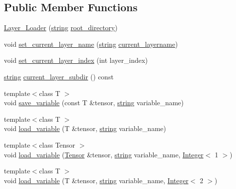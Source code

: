 \subsection*{Public Member Functions}
\begin{DoxyCompactItemize}
\item 
\hyperlink{structbc_1_1nn_1_1Layer__Loader_a6c0c0841d1783a7086914db80c806abd}{Layer\+\_\+\+Loader} (\hyperlink{structbc_1_1string}{string} \hyperlink{structbc_1_1nn_1_1Layer__Loader_a8447f957112de14989e567aab56d847b}{root\+\_\+directory})
\item 
void \hyperlink{structbc_1_1nn_1_1Layer__Loader_af679b0095e96922dfbb9dea7e4e1dcfb}{set\+\_\+current\+\_\+layer\+\_\+name} (\hyperlink{structbc_1_1string}{string} \hyperlink{structbc_1_1nn_1_1Layer__Loader_a51ea68daf7551573c3bd85d805c25da6}{current\+\_\+layername})
\item 
void \hyperlink{structbc_1_1nn_1_1Layer__Loader_a453dfb4c484e36b23c0d5d7c436efba2}{set\+\_\+current\+\_\+layer\+\_\+index} (int layer\+\_\+index)
\item 
\hyperlink{structbc_1_1string}{string} \hyperlink{structbc_1_1nn_1_1Layer__Loader_a16b97a62f8687323772d18f8ff2fb7ec}{current\+\_\+layer\+\_\+subdir} () const
\item 
{\footnotesize template$<$class T $>$ }\\void \hyperlink{structbc_1_1nn_1_1Layer__Loader_a41c022ea61234a753938fcc139a2ae85}{save\+\_\+variable} (const T \&tensor, \hyperlink{structbc_1_1string}{string} variable\+\_\+name)
\item 
{\footnotesize template$<$class T $>$ }\\void \hyperlink{structbc_1_1nn_1_1Layer__Loader_a3ac73abe3a2f8e760cd85a31a6f80e40}{load\+\_\+variable} (T \&tensor, \hyperlink{structbc_1_1string}{string} variable\+\_\+name)
\item 
{\footnotesize template$<$class Tensor $>$ }\\void \hyperlink{structbc_1_1nn_1_1Layer__Loader_ada98829d9ceb58adce067c3e1e99ed9d}{load\+\_\+variable} (\hyperlink{namespacebc_a659391e47ab612be3ba6c18cf9c89159}{Tensor} \&tensor, \hyperlink{structbc_1_1string}{string} variable\+\_\+name, \hyperlink{structbc_1_1traits_1_1Integer}{Integer}$<$ 1 $>$)
\item 
{\footnotesize template$<$class T $>$ }\\void \hyperlink{structbc_1_1nn_1_1Layer__Loader_ac1785de99dd005ba3c5ecc53ec35bb14}{load\+\_\+variable} (T \&tensor, \hyperlink{structbc_1_1string}{string} variable\+\_\+name, \hyperlink{structbc_1_1traits_1_1Integer}{Integer}$<$ 2 $>$)

\end{DoxyCompactItemize}
